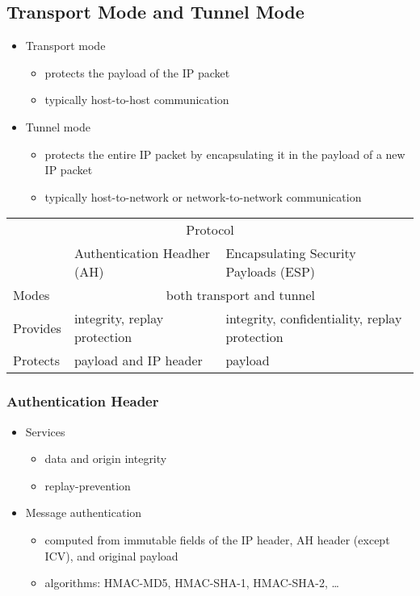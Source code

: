 \documentclass[final]{article}
\begin{document}
\subsection{Transport Mode and Tunnel Mode}
\begin{itemize}[nosep]
    \item Transport mode
          \begin{itemize}[nosep]
              \item protects the payload of the IP packet
              \item typically host-to-host communication
          \end{itemize}
    \item Tunnel mode
          \begin{itemize}[nosep]
              \item protects the entire IP packet by encapsulating it in the payload of a new IP packet
              \item typically host-to-network or network-to-network communication
          \end{itemize}
\end{itemize}
\begin{table}[H]
    \begin{tabular}{lll}
        \multicolumn{3}{c}{Protocol}                                                                             \\
                 & Authentication Headher (AH)                   & Encapsulating Security Payloads (ESP)         \\\toprule
        Modes    & \multicolumn{2}{c}{both transport and tunnel}                                                 \\
        Provides & integrity, replay protection                  & integrity, confidentiality, replay protection \\
        Protects & payload and IP header                         & payload                                       \\\bottomrule
    \end{tabular}
\end{table}
\subsubsection*{Authentication Header}
\begin{itemize}[nosep]
    \item Services
          \begin{itemize}[nosep]
              \item data and origin integrity
              \item replay-prevention
          \end{itemize}
    \item Message authentication
          \begin{itemize}[nosep]
              \item computed from immutable fields of the IP header, AH header (except ICV), and original payload
              \item algorithms: HMAC-MD5, HMAC-SHA-1, HMAC-SHA-2, \dots
          \end{itemize}
\end{itemize}
\end{document}
